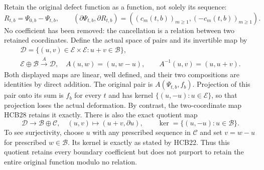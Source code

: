 \documentclass[11pt]{article}
\begin{document}
Retain the original defect function as a function, not solely its
sequence:
\begin{equation}\tag{HCB27}
 R_{t,b}=\Psi_{0,b}-\Psi_{t,b},\qquad
 (\partial\Psi_{t,b},\partial R_{t,b})
       =((c_m(t,b))_{m\geq1},(-c_m(t,b))_{m\geq1}).
\end{equation}
No coefficient has been removed: the cancellation is a relation
between two retained coordinates. Define the actual space of
pairs and its invertible map by
\begin{equation}\tag{HCB28}
\begin{gathered}
 \mathcal D=\{(u,v)\in\mathcal E\times\mathcal E:u+v\in\mathcal B\},\\
 \mathcal E\oplus\mathcal B\xrightarrow{\ A\ }\mathcal D,
 \quad A(u,w)=(u,w-u),\qquad
 A^{-1}(u,v)=(u,u+v).
\end{gathered}
\end{equation}
Both displayed maps are linear, well defined, and their two
compositions are identities by direct addition. The original pair
is $A(\Psi_{t,b},f_b)$. Projection of this pair onto its sum is
$f_b$ for every $t$ and has kernel $\{(u,-u):u\in\mathcal E\}$,
so that projection loses the actual deformation. By contrast, the
two-coordinate map HCB28 retains it exactly. There is also the
exact quotient map
\begin{equation}\tag{HCB29}
 \mathcal D\longrightarrow\mathcal B\oplus\mathcal C,
 \quad(u,v)\longmapsto(u+v,\partial u),\qquad
 \ker=\{(u,-u):u\in\mathcal B\}.
\end{equation}
To see surjectivity, choose $u$ with any prescribed sequence in
$\mathcal C$ and set $v=w-u$ for prescribed $w\in\mathcal B$.
Its kernel is exactly as stated by HCB22. Thus this quotient
retains every boundary coefficient but does not purport to retain
the entire original function modulo no relation.
\end{document}
